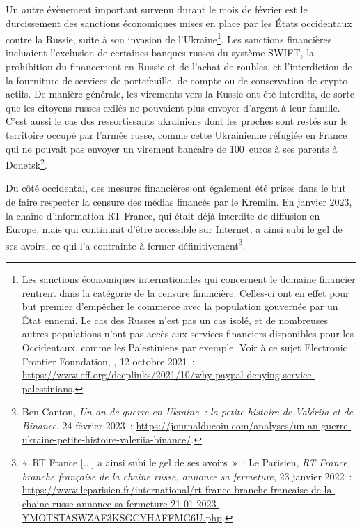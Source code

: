 Un autre évènement important survenu durant le mois de février est le durcissement des sanctions économiques mises en place par les États occidentaux contre la Russie, suite à son invasion de l'Ukraine\footnote{Les sanctions économiques internationales qui concernent le domaine financier rentrent dans la catégorie de la censure financière. Celles-ci ont en effet pour but premier d'empêcher le commerce avec la population gouvernée par un État ennemi. Le cas des Russes n'est pas un cas isolé, et de nombreuses autres populations n'ont pas accès aux services financiers disponibles pour les Occidentaux, comme les Palestiniens par exemple. Voir à ce sujet Electronic Frontier Foundation, , 12 octobre 2021~: \url{https://www.eff.org/deeplinks/2021/10/why-paypal-denying-service-palestinians}.}. Les sanctions financières incluaient l'exclusion de certaines banques russes du système SWIFT, la prohibition du financement en Russie et de l'achat de roubles, et l'interdiction de la fourniture de services de portefeuille, de compte ou de conservation de crypto-actifs. De manière générale, les virements vers la Russie ont été interdits, de sorte que les citoyens russes exilés ne pouvaient plus envoyer d'argent à leur famille. C'est aussi le cas des ressortissants ukrainiens dont les proches sont restés sur le territoire occupé par l'armée russe, comme cette Ukrainienne réfugiée en France qui ne pouvait pas envoyer un virement bancaire de 100~euros à ses parents à Donetsk\footnote{Ben Canton, \emph{Un an de guerre en Ukraine~: la petite histoire de Valériia et de Binance}, 24 février 2023~: \url{https://journalducoin.com/analyses/un-an-guerre-ukraine-petite-histoire-valeriia-binance/}.}. %

Du côté occidental, des mesures financières ont également été prises dans le but de faire respecter la censure des médias financés par le Kremlin. En janvier 2023, la chaîne d'information RT France, qui était déjà interdite de diffusion en Europe, mais qui continuait d'être accessible sur Internet, a ainsi subi le gel de ses avoirs, ce qui l'a contrainte à fermer définitivement\footnote{«~RT France [...] a ainsi subi le gel de ses avoirs~»~: Le Parisien, \emph{RT France, branche française de la chaîne russe, annonce sa fermeture}, 23 janvier 2022~: \url{https://www.leparisien.fr/international/rt-france-branche-francaise-de-la-chaine-russe-annonce-sa-fermeture-21-01-2023-YMOTSTASWZAF3KSGCYHAFFMG6U.php}.}.

